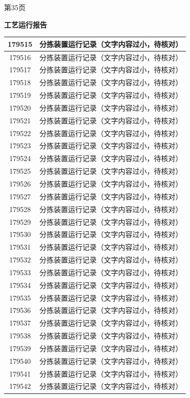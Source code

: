 \documentclass[UTF8,10pt,a4paper,fontset=fandol]{ctexart}
\begin{document}
\begin{center}
\begin{minipage}[t]{0.46\textwidth}
\vspace{2mm}
第35页
\end{minipage}
\hfill
\begin{minipage}[t]{0.46\textwidth}
\centering
\textbf{工艺运行报告}

\small
\begin{tabularx}{\linewidth}{|c|X|}
\hline
179515 & 分拣装置运行记录（文字内容过小，待核对）\\ \hline
179516 & 分拣装置运行记录（文字内容过小，待核对）\\ \hline
179517 & 分拣装置运行记录（文字内容过小，待核对）\\ \hline
179518 & 分拣装置运行记录（文字内容过小，待核对）\\ \hline
179519 & 分拣装置运行记录（文字内容过小，待核对）\\ \hline
179520 & 分拣装置运行记录（文字内容过小，待核对）\\ \hline
179521 & 分拣装置运行记录（文字内容过小，待核对）\\ \hline
179522 & 分拣装置运行记录（文字内容过小，待核对）\\ \hline
179523 & 分拣装置运行记录（文字内容过小，待核对）\\ \hline
179524 & 分拣装置运行记录（文字内容过小，待核对）\\ \hline
179525 & 分拣装置运行记录（文字内容过小，待核对）\\ \hline
179526 & 分拣装置运行记录（文字内容过小，待核对）\\ \hline
179527 & 分拣装置运行记录（文字内容过小，待核对）\\ \hline
179528 & 分拣装置运行记录（文字内容过小，待核对）\\ \hline
179529 & 分拣装置运行记录（文字内容过小，待核对）\\ \hline
179530 & 分拣装置运行记录（文字内容过小，待核对）\\ \hline
179531 & 分拣装置运行记录（文字内容过小，待核对）\\ \hline
179532 & 分拣装置运行记录（文字内容过小，待核对）\\ \hline
179533 & 分拣装置运行记录（文字内容过小，待核对）\\ \hline
179534 & 分拣装置运行记录（文字内容过小，待核对）\\ \hline
179535 & 分拣装置运行记录（文字内容过小，待核对）\\ \hline
179536 & 分拣装置运行记录（文字内容过小，待核对）\\ \hline
179537 & 分拣装置运行记录（文字内容过小，待核对）\\ \hline
179538 & 分拣装置运行记录（文字内容过小，待核对）\\ \hline
179539 & 分拣装置运行记录（文字内容过小，待核对）\\ \hline
179540 & 分拣装置运行记录（文字内容过小，待核对）\\ \hline
179541 & 分拣装置运行记录（文字内容过小，待核对）\\ \hline
179542 & 分拣装置运行记录（文字内容过小，待核对）\\ \hline
\end{tabularx}


\end{minipage}
\end{center}
\end{document}
